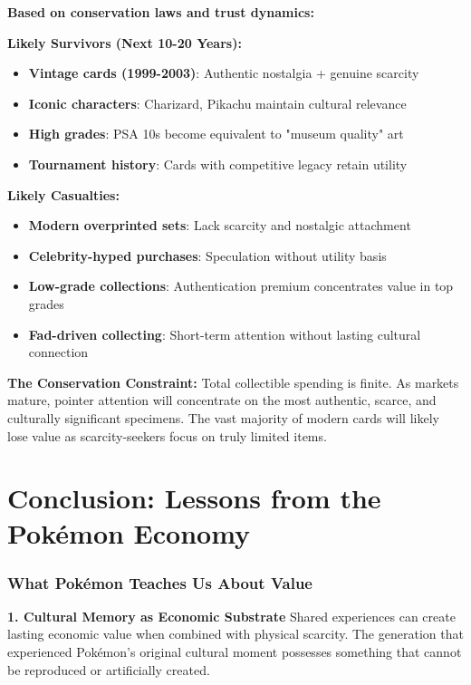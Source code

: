 \documentclass[11pt,oneside]{book}
\begin{document}
\textbf{Based on conservation laws and trust dynamics:}

\textbf{Likely Survivors (Next 10-20 Years):}
\begin{itemize}
\item \textbf{Vintage cards (1999-2003)}: Authentic nostalgia + genuine scarcity
\item \textbf{Iconic characters}: Charizard, Pikachu maintain cultural relevance
\item \textbf{High grades}: PSA 10s become equivalent to "museum quality" art
\item \textbf{Tournament history}: Cards with competitive legacy retain utility
\end{itemize}

\textbf{Likely Casualties:}
\begin{itemize}
\item \textbf{Modern overprinted sets}: Lack scarcity and nostalgic attachment
\item \textbf{Celebrity-hyped purchases}: Speculation without utility basis
\item \textbf{Low-grade collections}: Authentication premium concentrates value in top grades
\item \textbf{Fad-driven collecting}: Short-term attention without lasting cultural connection
\end{itemize}

\textbf{The Conservation Constraint:}
Total collectible spending is finite. As markets mature, pointer attention will concentrate on the most authentic, scarce, and culturally significant specimens. The vast majority of modern cards will likely lose value as scarcity-seekers focus on truly limited items.

\section{Conclusion: Lessons from the Pokémon Economy}

\subsubsection{What Pokémon Teaches Us About Value}

\textbf{1. Cultural Memory as Economic Substrate}
Shared experiences can create lasting economic value when combined with physical scarcity. The generation that experienced Pokémon's original cultural moment possesses something that cannot be reproduced or artificially created.
\end{document}
